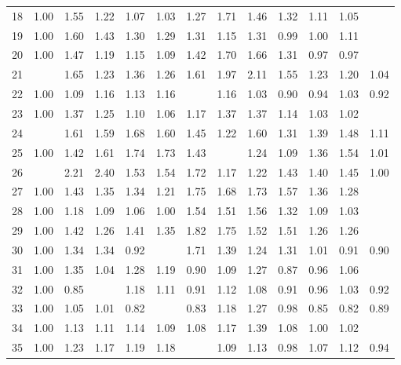 \begin{tabular}{rrrrrrrrrrrrr}
  18 & 1.00 & 1.55 & 1.22 & 1.07 & 1.03 & 1.27 & 1.71 & 1.46 & 1.32 & 1.11 & 1.05 & \color{blue}{0.91} \\ 
  19 & 1.00 & 1.60 & 1.43 & 1.30 & 1.29 & 1.31 & 1.15 & 1.31 & 0.99 & 1.00 & 1.11 & \color{blue}{0.90} \\ 
  20 & 1.00 & 1.47 & 1.19 & 1.15 & 1.09 & 1.42 & 1.70 & 1.66 & 1.31 & 0.97 & 0.97 & \color{blue}{0.86} \\ 
  21 & \color{blue}{1.00} & 1.65 & 1.23 & 1.36 & 1.26 & 1.61 & 1.97 & 2.11 & 1.55 & 1.23 & 1.20 & 1.04 \\ 
  22 & 1.00 & 1.09 & 1.16 & 1.13 & 1.16 & \color{blue}{0.81} & 1.16 & 1.03 & 0.90 & 0.94 & 1.03 & 0.92 \\ 
  23 & 1.00 & 1.37 & 1.25 & 1.10 & 1.06 & 1.17 & 1.37 & 1.37 & 1.14 & 1.03 & 1.02 & \color{blue}{0.92} \\ 
  24 & \color{blue}{1.00} & 1.61 & 1.59 & 1.68 & 1.60 & 1.45 & 1.22 & 1.60 & 1.31 & 1.39 & 1.48 & 1.11 \\ 
  25 & 1.00 & 1.42 & 1.61 & 1.74 & 1.73 & 1.43 & \color{blue}{0.93} & 1.24 & 1.09 & 1.36 & 1.54 & 1.01 \\ 
  26 & \color{blue}{1.00} & 2.21 & 2.40 & 1.53 & 1.54 & 1.72 & 1.17 & 1.22 & 1.43 & 1.40 & 1.45 & 1.00 \\ 
  27 & 1.00 & 1.43 & 1.35 & 1.34 & 1.21 & 1.75 & 1.68 & 1.73 & 1.57 & 1.36 & 1.28 & \color{blue}{0.99} \\ 
  28 & 1.00 & 1.18 & 1.09 & 1.06 & 1.00 & 1.54 & 1.51 & 1.56 & 1.32 & 1.09 & 1.03 & \color{blue}{0.89} \\ 
  29 & 1.00 & 1.42 & 1.26 & 1.41 & 1.35 & 1.82 & 1.75 & 1.52 & 1.51 & 1.26 & 1.26 & \color{blue}{0.96} \\ 
  30 & 1.00 & 1.34 & 1.34 & 0.92 & \color{blue}{0.87} & 1.71 & 1.39 & 1.24 & 1.31 & 1.01 & 0.91 & 0.90 \\ 
  31 & 1.00 & 1.35 & 1.04 & 1.28 & 1.19 & 0.90 & 1.09 & 1.27 & 0.87 & 0.96 & 1.06 & \color{blue}{0.84} \\ 
  32 & 1.00 & 0.85 & \color{blue}{0.83} & 1.18 & 1.11 & 0.91 & 1.12 & 1.08 & 0.91 & 0.96 & 1.03 & 0.92 \\ 
  33 & 1.00 & 1.05 & 1.01 & 0.82 & \color{blue}{0.82} & 0.83 & 1.18 & 1.27 & 0.98 & 0.85 & 0.82 & 0.89 \\ 
  34 & 1.00 & 1.13 & 1.11 & 1.14 & 1.09 & 1.08 & 1.17 & 1.39 & 1.08 & 1.00 & 1.02 & \color{blue}{0.95} \\ 
  35 & 1.00 & 1.23 & 1.17 & 1.19 & 1.18 & \color{blue}{0.93} & 1.09 & 1.13 & 0.98 & 1.07 & 1.12 & 0.94 \\ 

\end{tabular}
